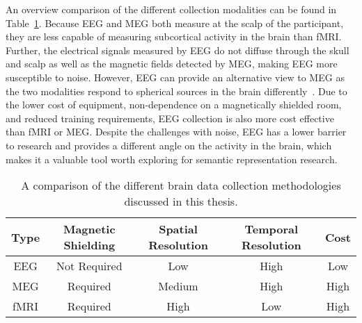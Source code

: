 An overview comparison of the different collection modalities can be found in 
Table~\ref{table:modalities}. Because EEG and MEG both measure at the scalp of 
the participant, they are less capable of measuring subcortical activity in the 
brain than fMRI. Further, the electrical signals measured by EEG do not diffuse 
through the skull and scalp as well as the magnetic fields detected by MEG, 
making EEG more susceptible to noise. However, EEG can provide an alternative 
view to MEG as the two modalities respond to spherical sources in the brain 
differently~\cite{cohen1983demonstration}. Due to the lower cost of equipment, 
non-dependence on a magnetically shielded room, and reduced training 
requirements, EEG collection is also more cost effective than fMRI or MEG.  
Despite the challenges with noise, EEG has a lower barrier to research and 
provides a different angle on the activity in the brain, which makes it a 
valuable tool worth exploring for semantic representation research. 

\begin{table}[t]
  \begin{center}
    \def\arraystretch{1.5}
    \begin{tabular}{ |c|c|c|c|c| }
      \hline
      Type & Magnetic Shielding & Spatial Resolution & Temporal 
      Resolution & Cost \\
      \hline
      EEG & Not Required & Low & High & Low \\
      MEG & Required & Medium & High & High \\
      fMRI & Required & High & Low & High \\
      \hline
    \end{tabular}
  \end{center}
  \caption[Collection Methodologies Comparison]{
    A comparison of the different brain data collection methodologies discussed 
    in this thesis.
  }
  \label{table:modalities}
\end{table}
